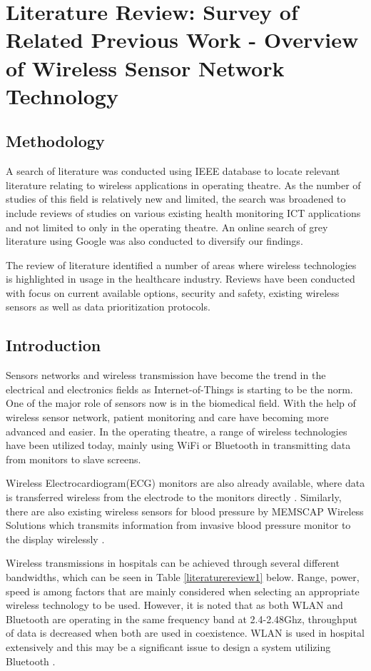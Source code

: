 \chapter{Literature Review: Survey of Related Previous Work - Overview of Wireless Sensor Network Technology}

\section{Methodology}

A search of literature was conducted using IEEE database to locate relevant literature relating to wireless applications in operating theatre. As the number of studies of this field is relatively new and limited, the search was broadened to include reviews of studies on various existing health monitoring ICT applications and not limited to only in the operating theatre. An online search of grey literature using Google was also conducted to diversify our findings. 

The review of literature identified a number of areas where wireless technologies is highlighted in usage in the healthcare industry. Reviews have been conducted with focus on current available options, security and safety, existing wireless sensors as well as data prioritization protocols. 

\section{Introduction}

Sensors networks and wireless transmission have become the trend in the electrical and electronics fields as Internet-of-Things is starting to be the norm. One of the major role of sensors now is in the biomedical field. With the help of wireless sensor network, patient monitoring and care have becoming more advanced and easier. In the operating theatre, a range of wireless technologies have been utilized today, mainly using WiFi or Bluetooth in transmitting data from monitors to slave screens. 

Wireless Electrocardiogram(ECG) monitors are also already available, where data is transferred wireless from the electrode to the monitors directly \cite{lit1}. Similarly, there are also existing wireless sensors for blood pressure by MEMSCAP Wireless Solutions which transmits information from invasive blood pressure monitor to the display wirelessly \cite{lit2}.  

Wireless transmissions in hospitals can be achieved through several different bandwidths, which can be seen in Table \ref{literaturereview1} below. Range, power, speed is among factors that are mainly considered when selecting an appropriate wireless technology to be used. However, it is noted that as both WLAN and Bluetooth are operating in the same frequency band at 2.4-2.48Ghz, throughput of data is decreased when both are used in coexistence. WLAN is used in hospital extensively and this may be a significant issue to design a system utilizing Bluetooth \cite{lit3}. 

